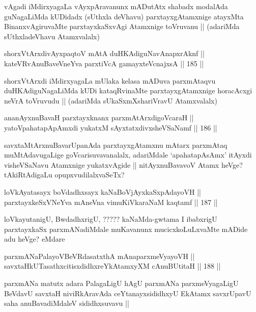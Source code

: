 \begin{artha}
vAgadi iMdirxyagaLa vAyxpAravanunx mADutAtx shabadx modalAda guNagaLiMda kUDidadx (sUthxla deVhavu) parxtayxgAtamxnige atayxMta BinanxvAgiruvaMte parxtayxkaSxvAgi Atamxnige toVruvanu || (adariMda sUthxladeVhavu Atamxvalalx)
\end{artha}

\begin{shl}
shorxVtArxdivAyxpaqtoV mAtA duHKAdiguNavAnapxrAknf || \\
kateVRvAnuBaveVneYva parxtiVcA gamayxteV\s cnajxsA ||  185 ||  
\end{shl}

\begin{artha}
shorxVtArxdi iMdirxyagaLa mUlaka kelasa mADuva parxmAtaqvu duHKAdiguNagaLiMda kUDi kataqRvinaMte parxtayxgAtamxnige horacAcxgi neVrA toVruvudu || (adariMda sUkaSxmXshariVravU Atamxvalalx)
\end{artha}

\begin{shl}
ananAyxnuBavaH parxtayxknanx parxmAtArxdigoVcaraH || \\
yatoV\s pahatapApAmxdi yukatxM sAyxtatxdivxsheVSaNamf ||  186 ||  
\end{shl}

\begin{artha}
savxtaMtArxnuBavarUpanAda parxtayxgAtamxnu mAtarx parxmAtaq muMtAdavugaLige goVcarisuvavanalalx, adariMdale `apahatapAsAmx' itAyxdi visheVSaNavu Atamxnige yukatxvAgide || nitAyxnuBavavoV Atamx heVge? tAkiRtAdigaLu opupxvudilalxvaSeTx? 
\end{artha}

\begin{shl}
loVkAyatasayx boVdadhxsayx kaNaBoVjAyxkaSxpAdayoVH || \\
parxtayxkeSxVNeYva mAneVna vimuKiVkaraNaM kaqtamf ||  187 ||  
\end{shl}

\begin{artha}
loVkayutanigU, BwdadhxrigU, {????? kaNaMda}-gwtama I ibabxrigU parxtayxkaSx parxmANadiMdale muKavanunx mucicxkoLuLxvaMte mADide adu heVge? eMdare
\end{artha}

\begin{shl}
parxmANaPalayoVBeVRdasatxthA mAnaparxmeVyayoVH || \\
savxtaHkUTasathxcitisxdidhxreYkAtamxyXM cAnuBUtitaH ||  188 ||  
\end{shl}

\begin{artha}
parxmANa matutx adara PalagaLigU hAgU parxmANa parxmeVyagaLigU BeVdavU savxtaH niviRkAravAda ceYtanayxsididhxyU EkAtamx savxrUpavU saha anuBavadiMdaleV sididhxsuvavu ||
\end{artha}

